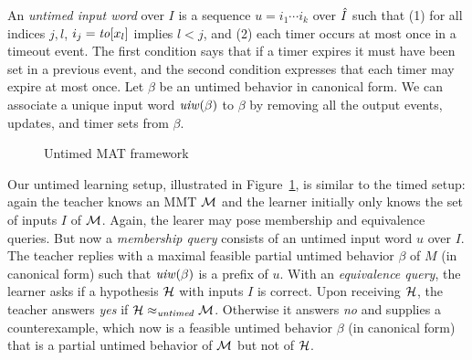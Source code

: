 An \emph{untimed input word} over $I$ is a sequence $u = i_1 \cdots i_k$ over $\hat{I}$ such that (1)
for all indices $j, l$, $i_j = \mathit{to}[x_l]$ implies $l < j$, and (2) each timer occurs at most once in a timeout event.
The first condition  says that if a timer expires it must have been set in a previous event, and the second condition  expresses that
each timer may expire at most once.
Let $\beta$ be an untimed behavior in canonical form.
We can associate a unique input word $\mathit{uiw}(\beta)$ to $\beta$ by removing all the output events,
updates, and timer sets from $\beta$.
\begin{figure}
\begin{center}
\end{center}    
\caption{Untimed MAT framework}
\label{fig:untimed MAT}
\end{figure}

Our untimed learning setup, illustrated in Figure~\ref{fig:untimed MAT}, is similar to the timed setup:
again the teacher knows an MMT ${\mathcal M}$ and the learner initially only knows the set of inputs $I$ of ${\mathcal M}$.
Again, the learer may pose membership and equivalence queries.
But now a \emph{membership query} consists of an untimed input word $u$ over $I$.
The teacher replies with a maximal feasible partial untimed behavior $\beta$ of $M$ (in canonical form) such that
$\mathit{uiw}(\beta)$ is a prefix of $u$.
With an \emph{equivalence query}, the learner asks if a hypothesis ${\mathcal H}$ with inputs $I$ is correct.
Upon receiving ${\mathcal H}$, the teacher answers \emph{yes} if ${\mathcal H} \approx_{\mathit{untimed}} {\mathcal M}$.
Otherwise it answers \emph{no} and supplies a counterexample, which now is a feasible untimed behavior $\beta$ (in canonical form) that
is a partial untimed behavior of ${\mathcal M}$ but not of ${\mathcal H}$.

